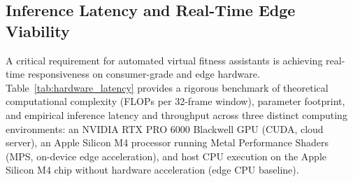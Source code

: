 \documentclass[runningheads]{llncs}
\begin{document}
\subsection{Inference Latency and Real-Time Edge Viability}
\label{sec:latency}

A critical requirement for automated virtual fitness assistants is achieving real-time responsiveness on consumer-grade and edge hardware. Table~\ref{tab:hardware_latency} provides a rigorous benchmark of theoretical computational complexity (FLOPs per 32-frame window), parameter footprint, and empirical inference latency and throughput across three distinct computing environments: an NVIDIA RTX PRO 6000 Blackwell GPU (CUDA, cloud server), an Apple Silicon M4 processor running Metal Performance Shaders (MPS, on-device edge acceleration), and host CPU execution on the Apple Silicon M4 chip without hardware acceleration (edge CPU baseline).

\begin{table}[!t]
\centering
\caption{Computational complexity (Parameters, FLOPs per 32-frame window) and inference latency across server and edge hardware platforms.}
\label{tab:hardware_latency}
\end{table}
\end{document}
